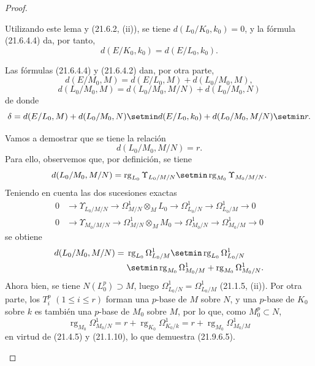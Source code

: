 \begin{proof}
\begin{enumerate}
  Utilizando este lema y (21.6.2, (ii)), se tiene $d(L_0/K_0,k_0)=0$, y la
  fórmula (21.6.4.4) da, por tanto,
  \[
    d(E/K_0,k_0)=d(E/L_0,k_0).
  \]

  Las fórmulas (21.6.4.4) y (21.6.4.2) dan, por otra parte,
  \[
    d(E/M_0,M)=d(E/L_0,M)+d(L_0/M_0,M),
  \]
  \[
    d(L_0/M_0,M)=d(L_0/M_0,M/N)+d(L_0/M_0,N)
  \]
  de donde
  \[
    \delta=d(E/L_0,M)+d(L_0/M_0,N)\setmin d(E/L_0,k_0)
    +d(L_0/M_0,M/N)\setmin r.
  \]

  Vamos a demostrar que se tiene la relación
  \begin{equation}
  \tag{21.9.6.5}
  \label{0.21.9.6.5-fr}
    d(L_0/M_0,M/N)=r.
  \end{equation}
  Para ello, observemos que, por definición, se tiene
  \[
    d(L_0/M_0,M/N)
    =\operatorname{rg}_{L_0}\Upsilon_{L_0/M/N}
    \setmin\operatorname{rg}_{M_0}\Upsilon_{M_0/M/N}.
  \]
  Teniendo en cuenta las dos sucesiones exactas
  \[
  \begin{aligned}
    0&\longrightarrow\Upsilon_{L_0/M/N}
      \longrightarrow\Omega^1_{M/N}\otimes_ML_0
      \longrightarrow\Omega^1_{L_0/N}
      \longrightarrow\Omega^1_{L_0/M}\longrightarrow0\\
    0&\longrightarrow\Upsilon_{M_0/M/N}
      \longrightarrow\Omega^1_{M/N}\otimes_MM_0
      \longrightarrow\Omega^1_{M_0/N}
      \longrightarrow\Omega^1_{M_0/M}\longrightarrow0
  \end{aligned}
  \]
  se obtiene
  \[
  \begin{split}
    d(L_0/M_0,M/N)={}&\operatorname{rg}_{L_0}\Omega^1_{L_0/M}
      \setmin\operatorname{rg}_{L_0}\Omega^1_{L_0/N}\\
      &\setmin\operatorname{rg}_{M_0}\Omega^1_{M_0/M}
      +\operatorname{rg}_{M_0}\Omega^1_{M_0/N}.
  \end{split}
  \]
  Ahora bien, se tiene $N(L_0^p)\supset M$, luego
  $\Omega^1_{L_0/N}=\Omega^1_{L_0/M}$ (21.1.5, (ii)). Por otra parte, los
  $T_i^p$ $(1\leqslant i\leqslant r)$ forman una $p$-base de $M$ sobre $N$,
  y una $p$-base de $K_0$ sobre $k$ es también una $p$-base de $M_0$ sobre
  $M$, por lo que, como $M_0^p\subset N$,
  \[
    \operatorname{rg}_{M_0}\Omega^1_{M_0/N}
    =r+\operatorname{rg}_{K_0}\Omega^1_{K_0/k}
    =r+\operatorname{rg}_{M_0}\Omega^1_{M_0/M}
  \]
  en virtud de (21.4.5) y (21.1.10), lo que demuestra (21.9.6.5).


\end{enumerate}
\end{proof}
